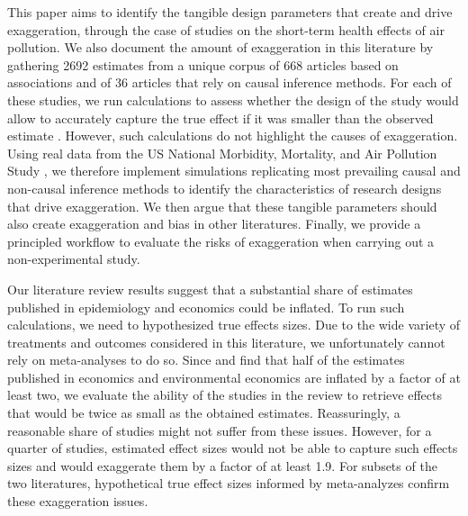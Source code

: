 \documentclass[12pt]{article}
\begin{document}
    This paper aims to identify the tangible design parameters that create and drive exaggeration, through the case of studies on the short-term health effects of air pollution. We also document the amount of exaggeration in this literature by gathering 2692 estimates from a unique corpus of 668 articles based on associations and of 36 articles that rely on causal inference methods. For each of these studies, we run  calculations to assess whether the design of the study would allow to accurately capture the true effect if it was smaller than the observed estimate \citep{gelman_beyond_2014, ioannidis_power_2017, lu_note_2019, timm_retrodesign_2019}. However, such calculations do not highlight the causes of exaggeration. Using real data from the US National Morbidity, Mortality, and Air Pollution Study \citep{samet2000national}, we therefore implement simulations replicating most prevailing causal and non-causal inference methods to identify the characteristics of research designs that drive exaggeration. We then argue that these tangible parameters should also create exaggeration and bias in other literatures. Finally, we provide a principled workflow to evaluate the risks of exaggeration when carrying out a non-experimental study.
    
    Our literature review results suggest that a substantial share of estimates published in epidemiology and economics could be inflated. To run such calculations, we need to hypothesized true effects sizes. Due to the wide variety of treatments and outcomes considered in this literature, we unfortunately cannot rely on meta-analyses to do so. Since \cite{ioannidis_power_2017} and \cite{ferraro_featureis_2020} find that half of the estimates published in economics and environmental economics are inflated by a factor of at least two, we evaluate the ability of the studies in the review to retrieve effects that would be twice as small as the obtained estimates. Reassuringly, a reasonable share of studies might not suffer from these issues. However, for a quarter of studies, estimated effect sizes would not be able to capture such  effects sizes and would exaggerate them by a factor of at least 1.9. For subsets of the two literatures, hypothetical true effect sizes informed by meta-analyzes confirm these exaggeration issues.
\end{document}
